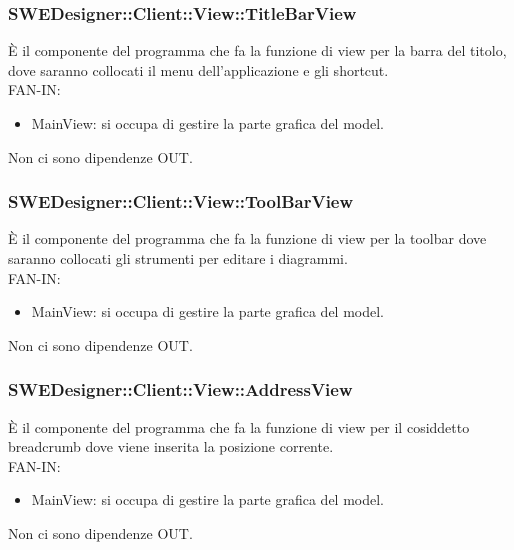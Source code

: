 \documentclass[../PianoDiQualifica.tex]{subfiles}
\begin{document}
		\subsubsection{SWEDesigner::Client::View::TitleBarView}
		È il componente del programma che fa la funzione di view per la barra del titolo, dove saranno collocati il menu dell’applicazione e gli shortcut.\\
		FAN-IN:
		\begin{itemize}
			\item MainView: si occupa di gestire la parte grafica del model.
		\end{itemize}
		Non ci sono dipendenze OUT.\\
		\subsubsection{SWEDesigner::Client::View::ToolBarView}
		È il componente del programma che fa la funzione di view per la toolbar dove saranno collocati gli strumenti per editare i diagrammi.\\
		FAN-IN:
		\begin{itemize}
			\item MainView: si occupa di gestire la parte grafica del model.
		\end{itemize}
		Non ci sono dipendenze OUT.\\
		\subsubsection{SWEDesigner::Client::View::AddressView}
		È il componente del programma che fa la funzione di view per il cosiddetto breadcrumb dove viene inserita la posizione corrente.\\
		FAN-IN:
		\begin{itemize}
			\item MainView: si occupa di gestire la parte grafica del model.
		\end{itemize}
		Non ci sono dipendenze OUT.\\
\end{document}
